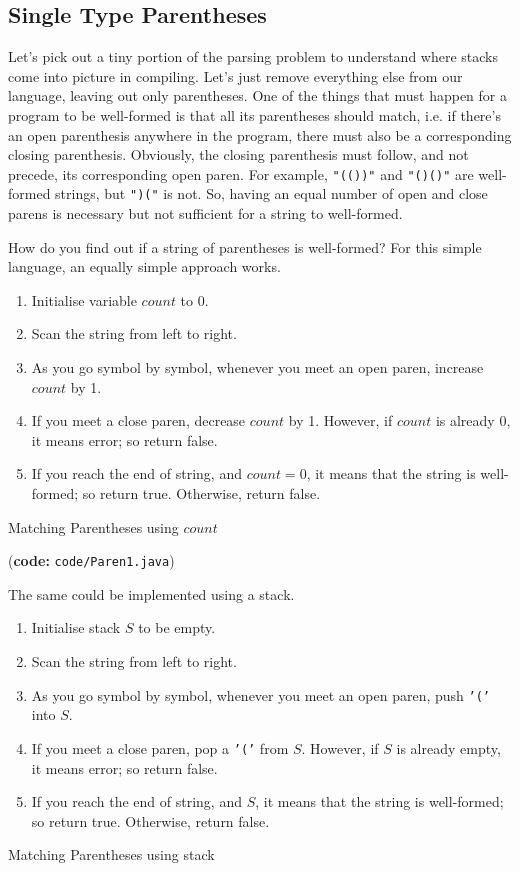 \documentclass[12pt,a4paper]{article}
\begin{document}
\subsection{Single Type Parentheses}
Let's pick out a tiny portion of the parsing problem to understand where stacks come into picture in compiling. Let's just remove everything else from our language, leaving out only parentheses. One of the things that must happen for a program to be well-formed is that all its parentheses should match, i.e. if there's an open parenthesis anywhere in the program, there must also be a corresponding closing parenthesis. Obviously, the closing parenthesis must follow, and not precede, its corresponding open paren. For example, \texttt{"(())"} and \texttt{"()()"} are well-formed strings, but \texttt{")("} is not. So, having an equal number of open and close parens is necessary but not sufficient for a string to well-formed.

How do you find out if a string of parentheses is well-formed? For this simple language, an equally simple approach works.
\begin{algorithm}
\begin{enumerate}
\item Initialise variable $count$ to 0.
\item Scan the string from left to right.
\item As you go symbol by symbol, whenever you meet an open paren, increase $count$ by 1.
\item If you meet a close paren, decrease $count$ by 1. However, if $count$ is already 0, it means error; so return false.
\item If you reach the end of string, and $count = 0$, it means that the string is well-formed; so return true. Otherwise, return false. 
\end{enumerate}
\caption{Matching Parentheses using $count$}
\label{a:mp1}
\end{algorithm}

(\textbf{code:} \texttt{code/Paren1.java})


The same could be implemented using a stack. 

\begin{algorithm}
\begin{enumerate}
\item Initialise stack $S$ to be empty.
\item Scan the string from left to right.
\item As you go symbol by symbol, whenever you meet an open paren, push \texttt{'('} into $S$.
\item If you meet a close paren, pop a \texttt{'('} from $S$. However, if $S$ is already empty, it means error; so return false.
\item If you reach the end of string, and $S$, it means that the string is well-formed; so return true. Otherwise, return false. 
\end{enumerate}
\caption{Matching Parentheses using stack}
\label{a:mp2}
\end{algorithm}
\end{document}
